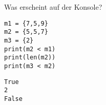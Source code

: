\question[3] Was erscheint auf der Konsole?
\begin{lstlisting}
m1 = {7,5,9}
m2 = {5,5,7}
m3 = {2}
print(m2 < m1)
print(len(m2))
print(m3 < m2)
\end{lstlisting}
\begin{solutionbox}{2cm}
\begin{lstlisting}
True
2
False
\end{lstlisting}
\end{solutionbox}

